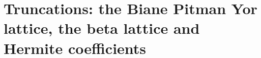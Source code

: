 \chapter{Truncations: the Biane Pitman Yor lattice, the beta lattice and Hermite coefficients}\label{vol2:ch16}





